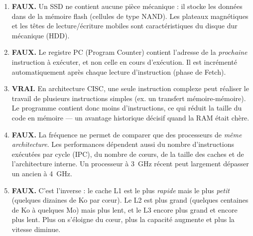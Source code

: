\documentclass[11pt]{article}
\newcommand{\cle}[1]{{\popxbold\color{popdark}#1}}
\begin{document}
\begin{corrige}
\begin{enumerate}
    \item \textbf{FAUX.} Un \cle{SSD} ne contient aucune pièce mécanique : il stocke les données dans de la mémoire flash (cellules de type NAND). Les plateaux magnétiques et les têtes de lecture/écriture mobiles sont caractéristiques du disque dur mécanique (HDD).
    \item \textbf{FAUX.} Le registre \cle{PC} (Program Counter) contient l'adresse de la \emph{prochaine} instruction à exécuter, et non celle en cours d'exécution. Il est incrémenté automatiquement après chaque lecture d'instruction (phase de Fetch).
    \item \textbf{VRAI.} En architecture \cle{CISC}, une seule instruction complexe peut réaliser le travail de plusieurs instructions simples (ex. un transfert mémoire-mémoire). Le programme contient donc moins d'instructions, ce qui réduit la taille du code en mémoire — un avantage historique décisif quand la RAM était chère.
    \item \textbf{FAUX.} La fréquence ne permet de comparer que des processeurs de \emph{même architecture}. Les performances dépendent aussi du nombre d'instructions exécutées par cycle (IPC), du nombre de cœurs, de la taille des caches et de l'architecture interne. Un processeur à \SI{3}{\giga\hertz} récent peut largement dépasser un ancien à \SI{4}{\giga\hertz}.
    \item \textbf{FAUX.} C'est l'inverse : le cache \cle{L1} est le plus \emph{rapide} mais le plus \emph{petit} (quelques dizaines de Ko par cœur). Le L2 est plus grand (quelques centaines de Ko à quelques Mo) mais plus lent, et le L3 encore plus grand et encore plus lent. Plus on s'éloigne du cœur, plus la capacité augmente et plus la vitesse diminue.
\end{enumerate}
\end{corrige}
\end{document}
